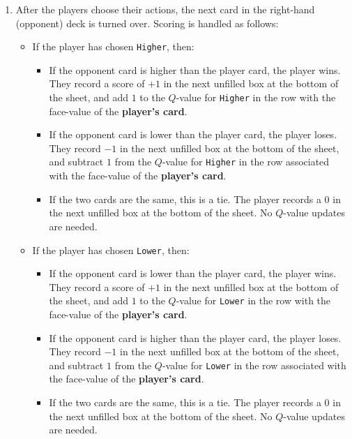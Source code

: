 \documentclass[leqno,11pt]{article}
\begin{document}
\begin{enumerate}
	\item After the players choose their actions, the next card in the right-hand (opponent) deck is turned
		over.  Scoring is handled as follows:
		\begin{itemize}
			\item If the player has chosen \texttt{Higher}, then:
				\begin{itemize}
					\item If the opponent card is higher than the player card, the player
						wins.  They record a score of $+1$ in the next unfilled
						box at the bottom of the sheet, and add $1$ to the
						$Q$-value for \texttt{Higher} in the row 
						with the face-value of the \textbf{player's card}.
					\item If the opponent card is lower than the player card, the player
						loses.  They record $-1$ in the next unfilled
						box at the bottom of the sheet,  and subtract $1$ from the
						$Q$-value for \texttt{Higher} in the row associated
						with the face-value of the \textbf{player's card}.
					\item If the two cards are the same, this is a tie.  The player records
						a $0$ in the next unfilled box at the bottom of the sheet.  No
						$Q$-value updates are needed.
				\end{itemize}
			\item If the player has chosen \texttt{Lower}, then:
				\begin{itemize}
					\item If the opponent card is lower than the player card, the player
						wins.  They record a score of $+1$ in the next unfilled
						box at the bottom of the sheet, and add $1$ to the
						$Q$-value for \texttt{Lower} in the row 
						with the face-value of the \textbf{player's card}.
					\item If the opponent card is higher than the player card, the player
						loses.  They record $-1$ in the next unfilled
						box at the bottom of the sheet,  and subtract $1$ from the
						$Q$-value for \texttt{Lower} in the row associated
						with the face-value of the \textbf{player's card}.
					\item If the two cards are the same, this is a tie.  The player records
						a $0$ in the next unfilled box at the bottom of the sheet.  No
						$Q$-value updates are needed.
				\end{itemize}
	
		\end{itemize}
\end{enumerate} 
\end{document}
